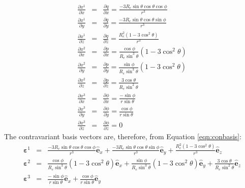\documentclass[11pt,letterpaper]{article}
\begin{document}
\begin{eqnarray}
\frac{\partial x^1}{\partial x} &=& \frac{\partial q}{\partial x} = \frac{-3 R_e \sin \theta \cos \theta \cos \phi}{r^3} \\
\frac{\partial x^1}{\partial y} &=& \frac{\partial q}{\partial y} = \frac{-3 R_e \sin \theta \cos \theta \sin \phi}{r^3} \\
\frac{\partial x^1}{\partial z} &=& \frac{\partial q}{\partial z} = \frac{R_e^2 \left( 1 - 3 \cos^2 \theta \right)}{r^3} \\
\frac{\partial x^2}{\partial x} &=& \frac{\partial p}{\partial x} = \frac{\cos \phi}{ R_e \sin^3 \theta} \left( 1 - 3 \cos^2 \theta \right) \\
\frac{\partial x^2}{\partial y} &=& \frac{\partial p}{\partial y} = \frac{\sin \phi}{ R_e \sin^3 \theta} \left( 1 - 3 \cos^2 \theta \right) \\
\frac{\partial x^2}{\partial z} &=& \frac{\partial p}{\partial z} = \frac{3 \cos \theta}{R_e \sin^2 \theta}\\
\frac{\partial x^3}{\partial x} &=& \frac{\partial \phi}{\partial x} = \frac{- \sin \phi}{r \sin \theta} \\
\frac{\partial x^3}{\partial y} &=& \frac{\partial \phi}{\partial y} = \frac{\cos \phi}{r \sin \theta} \\
\frac{\partial x^3}{\partial z} &=& \frac{\partial \phi}{\partial z} = 0
\end{eqnarray}
The contravariant basis vectors are, therefore, from Equation \ref{eqn:conbasis}:
\begin{eqnarray}
\boldsymbol{\varepsilon}^1 &=& \frac{-3 R_e \sin \theta \cos \theta \cos \phi}{r^3} \hat{\mathbf{e}}_x + \frac{-3 R_e \sin \theta \cos \theta \sin \phi}{r^3} \hat{\mathbf{e}}_y + \frac{R_e^2 \left( 1 - 3 \cos^2 \theta \right)}{r^3} \hat{\mathbf{e}}_z \\
\boldsymbol{\varepsilon}^2 &=& \frac{\cos \phi}{ R_e \sin^3 \theta} \left( 1 - 3 \cos^2 \theta \right) \hat{\mathbf{e}}_x +  \frac{\sin \phi}{ R_e \sin^3 \theta} \left( 1 - 3 \cos^2 \theta \right) \hat{\mathbf{e}}_y + \frac{3 \cos \theta}{R_e \sin^2 \theta} \hat{\mathbf{e}}_z \\
\boldsymbol{\varepsilon}^3 &=& \frac{- \sin \phi}{r \sin \theta} \hat{\mathbf{e}}_x + \frac{\cos \phi}{r \sin \theta} \hat{\mathbf{e}}_y
\end{eqnarray}
\end{document}

